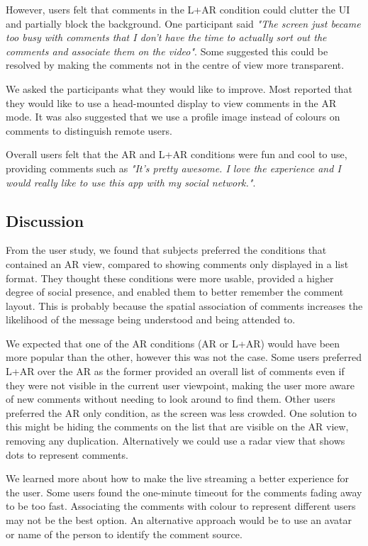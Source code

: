 However, users felt that comments in the L+AR condition could clutter the UI and partially block the background. One participant said \textit{"The screen just became too busy with comments that I don't have the time to actually sort out the comments and associate them on the video"}. Some suggested this could be resolved by making the comments not in the centre of view more transparent.
 
We asked the participants what they would like to improve. Most reported that they would like to use a head-mounted display to view comments in the AR mode.  It was also suggested that we use a profile image instead of colours on comments to distinguish remote users.
 
Overall users felt that the AR and L+AR conditions were fun and cool to use, providing comments such as \textit{"It's pretty awesome. I love the experience and I would really like to use this app with my social network."}.


\subsection{Discussion}

From the user study, we found that subjects preferred the conditions that contained an AR view, compared to showing comments only displayed in a list format. They thought these conditions were more usable, provided a higher degree of social presence, and enabled them to better remember the comment layout. This is probably because the spatial association of comments increases the likelihood of the message being understood and being attended to.

We expected that one of the AR conditions (AR or L+AR) would have been more popular than the other, however this was not the case. Some users preferred L+AR over the AR as the former provided an overall list of comments even if they were not visible in the current user viewpoint, making the user more aware of new comments without needing to look around to find them. Other users preferred the AR only condition, as the screen was less crowded. One solution to this might be hiding the comments on the list that are visible on the AR view, removing any duplication. Alternatively we could use a radar view that shows dots to represent comments. 

We learned more about how to make the live streaming a better experience for the user. Some users found the one-minute timeout for the comments fading away to be too fast. Associating the comments with colour to represent different users may not be the best option. An alternative approach would be to use an avatar or name of the person to identify the comment source. 

